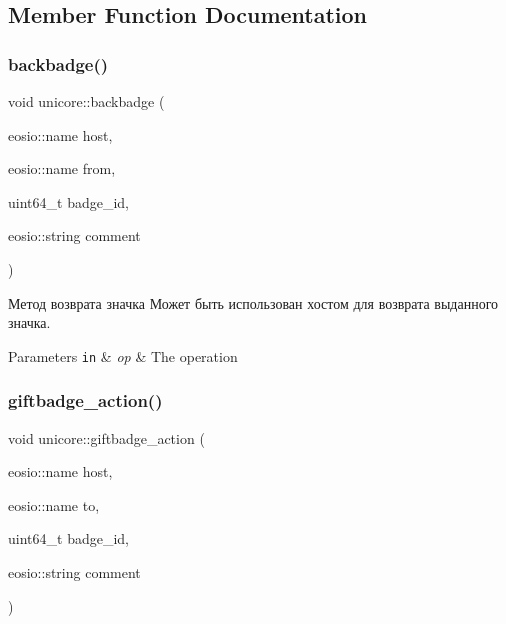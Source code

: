 \subsection{Member Function Documentation}
\mbox{\label{classeosio_1_1unicore_ac3ff0f2b8d521b7ff9a2184fd15d65fe}} 
\subsubsection{\texorpdfstring{backbadge()}{backbadge()}}
{\footnotesize\ttfamily void unicore\+::backbadge (\begin{DoxyParamCaption}\item[{eosio\+::name}]{host,  }\item[{eosio\+::name}]{from,  }\item[{uint64\+\_\+t}]{badge\+\_\+id,  }\item[{eosio\+::string}]{comment }\end{DoxyParamCaption})}



Метод возврата значка Может быть использован хостом для возврата выданного значка. 


\begin{DoxyParams}[1]{Parameters}
\mbox{\tt in}  & {\em op} & The operation \\
\hline
\end{DoxyParams}
\mbox{\label{classeosio_1_1unicore_aee33ad5dca93b5f3a55949f20e037569}} 
\subsubsection{\texorpdfstring{giftbadge\+\_\+action()}{giftbadge\_action()}}
{\footnotesize\ttfamily void unicore\+::giftbadge\+\_\+action (\begin{DoxyParamCaption}\item[{eosio\+::name}]{host,  }\item[{eosio\+::name}]{to,  }\item[{uint64\+\_\+t}]{badge\+\_\+id,  }\item[{eosio\+::string}]{comment }\end{DoxyParamCaption})\hspace{0.3cm}{\ttfamily [static]}}



